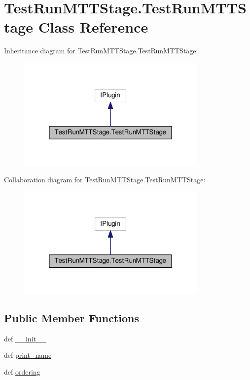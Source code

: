 \hypertarget{classTestRunMTTStage_1_1TestRunMTTStage}{\section{Test\-Run\-M\-T\-T\-Stage.\-Test\-Run\-M\-T\-T\-Stage Class Reference}
\label{classTestRunMTTStage_1_1TestRunMTTStage}
}


Inheritance diagram for Test\-Run\-M\-T\-T\-Stage.\-Test\-Run\-M\-T\-T\-Stage\-:
\nopagebreak
\begin{figure}[H]
\begin{center}
\leavevmode
\includegraphics[width=264pt]{classTestRunMTTStage_1_1TestRunMTTStage__inherit__graph}
\end{center}
\end{figure}


Collaboration diagram for Test\-Run\-M\-T\-T\-Stage.\-Test\-Run\-M\-T\-T\-Stage\-:
\nopagebreak
\begin{figure}[H]
\begin{center}
\leavevmode
\includegraphics[width=264pt]{classTestRunMTTStage_1_1TestRunMTTStage__coll__graph}
\end{center}
\end{figure}
\subsection*{Public Member Functions}
\begin{DoxyCompactItemize}
\item 
def \hyperlink{classTestRunMTTStage_1_1TestRunMTTStage_a832d01c482e3593c6ca5a70a8c50401b}{\-\_\-\-\_\-init\-\_\-\-\_\-}
\item 
def \hyperlink{classTestRunMTTStage_1_1TestRunMTTStage_ae33f5d11e9f6d745e5a4b8b527581787}{print\-\_\-name}
\item 
def \hyperlink{classTestRunMTTStage_1_1TestRunMTTStage_ab22af0d8f9b65095162240a35a072068}{ordering}
\end{DoxyCompactItemize}


